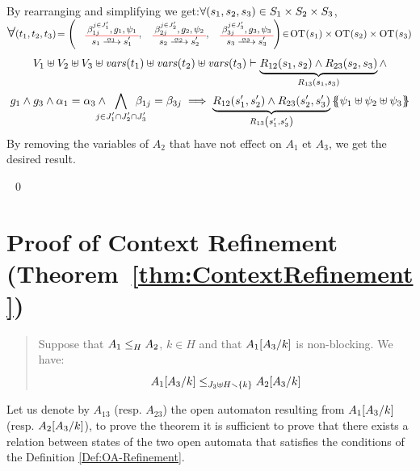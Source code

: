\documentclass[runningheads]{llncs}
\begin{document}
\begin{enumerate}
By rearranging and simplifying we get:$\forall \mpar{s_1,s_2,s_3} \in S_1\times S_2 \times S_3$, $ \bigsymb{\forall} \mpar{t_1,t_2, t_{3}}\!=\! \\\mpar{\OTx{1}{}{1}{1},\OTx{2}{}{2}{2},\OTx{3}{}{3}{3}}\! \in\! \fOT{s_1} \times\fOT{s_2} \times \fOT{s_3}$\\
\begin{multline*}
V_1\uplus V_2 \uplus V_3 \uplus \fvars{t_1} \uplus \fvars{t_2} \uplus \fvars{t_3} \vdash \underbrace{R_{12}\mpar{s_1, s_2} \wedge  R_{23}\mpar{s_2, s_3}}_{R_{13}\mpar{s_1, s_3}} \wedge \\ g_1  \wedge g_{3}
\wedge \alpha_1 = \alpha_{3}  \wedge \bigwedge_\subbox{j \in J'_1\cap J'_2 \cap J'_{3}} \beta_{1j} = \beta_{3j}
 \implies \underbrace{R_{12}\mpar{s'_1, s'_{2}}\wedge R_{23}\mpar{s'_2, s'_{3}}}_{R_{13}\mpar{s'_1, s'_3}} \psubst{\psi_1 \uplus \psi_2\uplus \psi_3 } 
\end{multline*}
By removing the variables of $A_2$ that have not effect on   $A_1$ et  $A_3$, we get the desired result.

\end{enumerate}

~\qed















\section{Proof of Context Refinement (Theorem~\ref{thm:ContextRefinement})}


\begin{quote}
Suppose that $\wrel{A_1}{A_2}{H}$, \(k \in H\) and that \(A_1\subst{A_3}{k}\) is non-blocking.
We have: \[\wrel{A_1\subst{A_3}{k}}{A_2\subst{A_3}{k}}{J_3 \uplus H \setminus \mbrc{k}}\]
\end{quote}


\proof
Let us denote by $A_{13}$ (resp. $A_{23}$) the open automaton resulting from $A_1\subst{A_3}{k}$ (resp. $A_2\subst{A_3}{k}$),  to prove the theorem it is sufficient to prove that there exists a relation between states of the two open automata that satisfies the conditions of the Definition \ref{Def:OA-Refinement}. 
\end{document}
